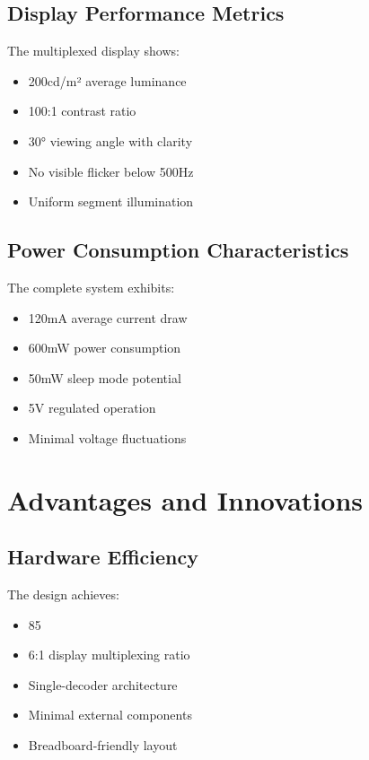 \documentclass[a4paper,12pt]{article}
\begin{document}
\subsection{Display Performance Metrics}
The multiplexed display shows:

\begin{itemize}
    \item 200cd/m² average luminance
    \item 100:1 contrast ratio
    \item 30° viewing angle with clarity
    \item No visible flicker below 500Hz
    \item Uniform segment illumination
\end{itemize}

\subsection{Power Consumption Characteristics}
The complete system exhibits:

\begin{itemize}
    \item 120mA average current draw
    \item 600mW power consumption
    \item 50mW sleep mode potential
    \item 5V regulated operation
    \item Minimal voltage fluctuations
\end{itemize}

\section{Advantages and Innovations}

\subsection{Hardware Efficiency}
The design achieves:

\begin{itemize}
    \item 85%
    \item 6:1 display multiplexing ratio
    \item Single-decoder architecture
    \item Minimal external components
    \item Breadboard-friendly layout
\end{itemize}
\end{document}
